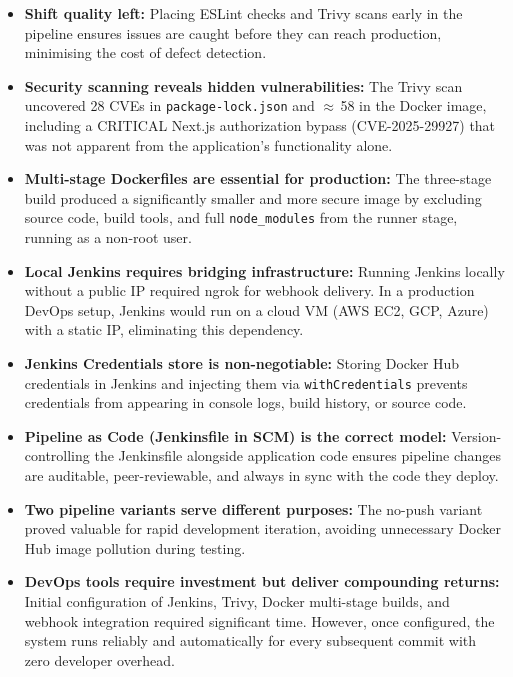 \documentclass[12pt,a4paper,oneside]{report}
\begin{document}
\begin{itemize}
  \item \textbf{Shift quality left:} Placing ESLint checks and Trivy scans early in
        the pipeline ensures issues are caught before they can reach production,
        minimising the cost of defect detection.

  \item \textbf{Security scanning reveals hidden vulnerabilities:} The Trivy scan
        uncovered 28 CVEs in \texttt{package-lock.json} and $\approx$\,58 in the
        Docker image, including a CRITICAL Next.js authorization bypass
        (CVE-2025-29927) that was not apparent from the application's functionality
        alone.

  \item \textbf{Multi-stage Dockerfiles are essential for production:} The
        three-stage build produced a significantly smaller and more secure image by
        excluding source code, build tools, and full \texttt{node\_modules} from
        the runner stage, running as a non-root user.

  \item \textbf{Local Jenkins requires bridging infrastructure:} Running Jenkins
        locally without a public IP required ngrok for webhook delivery. In a
        production DevOps setup, Jenkins would run on a cloud VM (AWS EC2, GCP,
        Azure) with a static IP, eliminating this dependency.

  \item \textbf{Jenkins Credentials store is non-negotiable:} Storing Docker Hub
        credentials in Jenkins and injecting them via \texttt{withCredentials}
        prevents credentials from appearing in console logs, build history, or
        source code.

  \item \textbf{Pipeline as Code (Jenkinsfile in SCM) is the correct model:}
        Version-controlling the Jenkinsfile alongside application code ensures
        pipeline changes are auditable, peer-reviewable, and always in sync with
        the code they deploy.

  \item \textbf{Two pipeline variants serve different purposes:} The no-push variant
        proved valuable for rapid development iteration, avoiding unnecessary Docker
        Hub image pollution during testing.

  \item \textbf{DevOps tools require investment but deliver compounding returns:}
        Initial configuration of Jenkins, Trivy, Docker multi-stage builds, and
        webhook integration required significant time. However, once configured, the
        system runs reliably and automatically for every subsequent commit with zero
        developer overhead.
\end{itemize}
\end{document}
